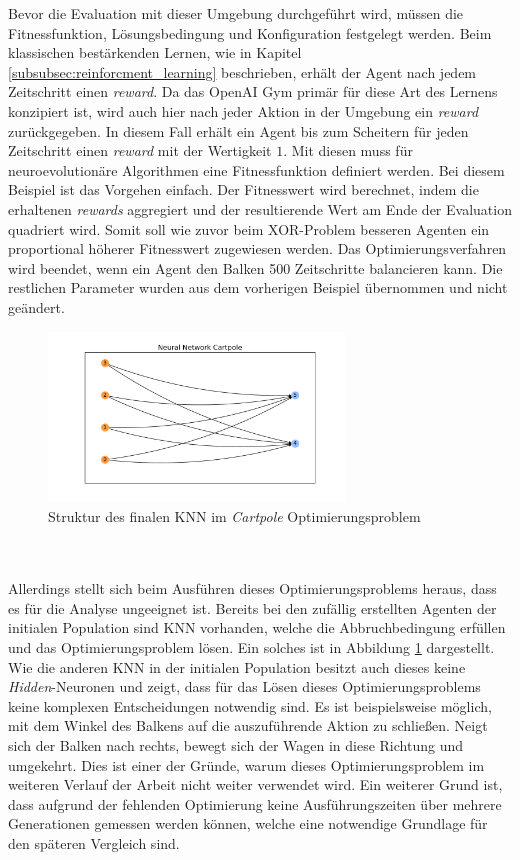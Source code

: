 Bevor die Evaluation mit dieser Umgebung durchgeführt wird, müssen die Fitnessfunktion, Lösungsbedingung und Konfiguration festgelegt werden. Beim klassischen bestärkenden Lernen, wie in Kapitel \ref{subsubsec:reinforcment_learning} beschrieben, erhält der Agent nach jedem Zeitschritt einen \emph{reward}. Da das OpenAI Gym primär für diese Art des Lernens konzipiert ist, wird auch hier nach jeder Aktion in der Umgebung ein \emph{reward} zurückgegeben. In diesem Fall erhält ein Agent bis zum Scheitern für jeden Zeitschritt einen \emph{reward} mit der Wertigkeit $1$. Mit diesen muss für neuroevolutionäre Algorithmen eine Fitnessfunktion definiert werden. Bei diesem Beispiel ist das Vorgehen einfach. Der Fitnesswert wird berechnet, indem die erhaltenen \emph{rewards} aggregiert und der resultierende Wert am Ende der Evaluation quadriert wird. Somit soll wie zuvor beim XOR-Problem besseren Agenten ein proportional höherer Fitnesswert zugewiesen werden. Das Optimierungsverfahren wird beendet, wenn ein Agent den Balken 500 Zeitschritte balancieren kann. Die restlichen Parameter wurden aus dem vorherigen Beispiel übernommen und nicht geändert.
\begin{figure}[!h]
	\centering
	\includegraphics[width=0.7\textwidth]{./img/pole_balancing_single_core/cartpole_neuroal_network.pdf} 
	\caption{Struktur des finalen KNN im \emph{Cartpole} Optimierungsproblem}
	\label{fig:cartpole_neural_network}
\end{figure}
\\\\
Allerdings stellt sich beim Ausführen dieses Optimierungsproblems heraus, dass es für die Analyse ungeeignet ist. Bereits bei den zufällig erstellten Agenten der initialen Population sind \ac{KNN} vorhanden, welche die Abbruchbedingung erfüllen und das Optimierungsproblem lösen. Ein solches ist in Abbildung \ref{fig:cartpole_neural_network} dargestellt. Wie die anderen \ac{KNN} in der initialen Population besitzt auch dieses keine \emph{Hidden}-Neuronen und zeigt, dass für das Lösen dieses Optimierungsproblems keine komplexen Entscheidungen notwendig sind. Es ist beispielsweise möglich, mit dem Winkel des Balkens auf die auszuführende Aktion zu schließen. Neigt sich der Balken nach rechts, bewegt sich der Wagen in diese Richtung und umgekehrt. Dies ist einer der Gründe, warum dieses Optimierungsproblem im weiteren Verlauf der Arbeit nicht weiter verwendet wird. Ein weiterer Grund ist, dass aufgrund der fehlenden Optimierung keine Ausführungszeiten über mehrere Generationen gemessen werden können, welche eine notwendige Grundlage für den späteren Vergleich sind.

